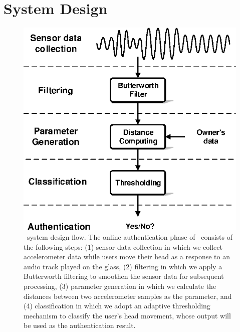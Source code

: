 \section{System Design} \label{sec:system}

\begin{figure}[t]
\centering
\includegraphics[width=0.75\columnwidth]{pic/system.eps}

\caption{\systemname~system design flow. The online authentication phase of \systemname~consists of the following steps: (1) sensor data collection in which we collect accelerometer data while users move their head as a response to an audio track played on the glass, (2) filtering in which we apply a Butterworth filtering to smoothen the sensor data for subsequent processing, (3) parameter generation in which we calculate the distances between two accelerometer samples as the parameter, and (4) classification in which we adopt an adaptive thresholding mechanism to classify the user's head movement, whose output will be used as the authentication result.}
\label{fig:sysarch}
\end{figure}


